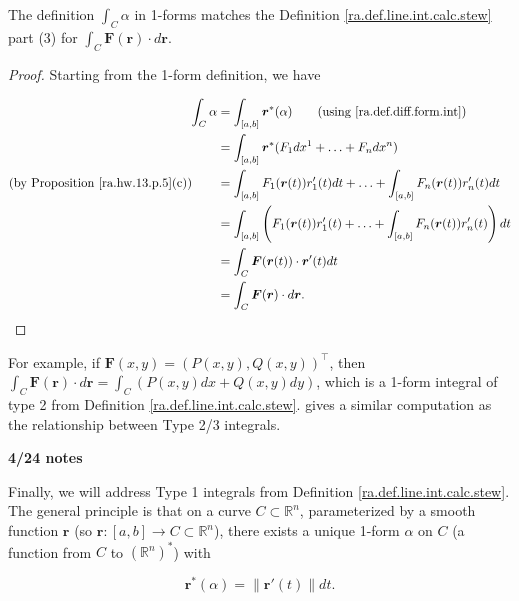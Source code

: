 \begin{proposition}

The definition \(\int_C \alpha\) in 1-forms matches the Definition \ref{ra.def.line.int.calc.stew} part (3) for \(\int_C \boldsymbol{F}(\boldsymbol{r})  \cdot d \boldsymbol{r}\). 

\end{proposition}

\begin{proof}

Starting from the 1-form definition, we have

\begin{align*}
\int_C \alpha & = \int_{[a,b]} \boldsymbol{r}^*(\alpha) \qquad \text{(using \eqref{ra.def.diff.form.int})}
\\ & =\int_{[a,b]} \boldsymbol{r}^*( F_1 dx^1 + \ldots + F_n dx^n)
\\  \text{(by Proposition \ref{ra.hw.13.p.5}(c))} \qquad & =\int_{[a,b]} F_1(\boldsymbol{r}(t)) r_1'(t) dt + \ldots + \int_{[a,b]} F_n(\boldsymbol{r}(t)) r_n'(t) dt
\\ & =\int_{[a,b]} \left( F_1(\boldsymbol{r}(t)) r_1'(t)  + \ldots + \int_{[a,b]} F_n(\boldsymbol{r}(t)) r_n'(t) \right)dt
\\ & = \int_C \boldsymbol{F}(\boldsymbol{r}(t))  \cdot \boldsymbol{r}'(t)  d t
\\ & = \int_C \boldsymbol{F}(\boldsymbol{r})  \cdot d \boldsymbol{r}.
\end{align*}

\end{proof}

For example, if \(\boldsymbol{F}(x,y) = (P(x,y), Q(x,y))^\top\), then \(\int_C \boldsymbol{F}(\boldsymbol{r}) \cdot d \boldsymbol{r} = \int_C ( P(x,y) dx + Q(x,y) dy) \), which is a 1-form integral of type 2 from Definition \ref{ra.def.line.int.calc.stew}. \citet{stewart2015calculus} gives a similar computation as the relationship between Type 2/3 integrals.

\textbf{4/24 notes}

Finally, we will address Type 1 integrals from Definition \ref{ra.def.line.int.calc.stew}. The general principle is that on a curve \(C \subset \mathbb{R}^n\), parameterized by a smooth function \(\boldsymbol{r}\) (so \(\boldsymbol{r}: [a,b] \to C \subset \mathbb{R}^n\)), there exists a unique 1-form \(\alpha\) on \(C\) (a function from \(C\) to \((\mathbb{R}^n)^*\)) with 

\[
\boldsymbol{r}^*(\alpha) = \lVert \boldsymbol{r}'(t) \rVert dt.
\]

